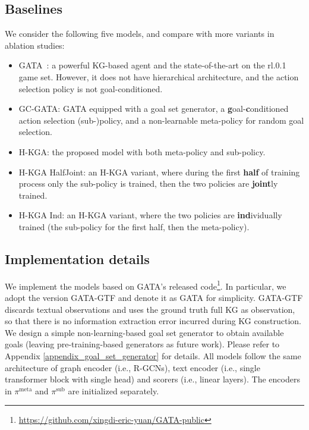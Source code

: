 \documentclass[11pt]{article}
\begin{document}
\subsection{Baselines}

We consider the following five models, and compare with more variants in ablation studies:
\begin{itemize}
    \item GATA~\cite{adhikari2020gatav2}: a powerful KG-based agent and the state-of-the-art on the rl.0.1 game set. However, it does not have hierarchical architecture, and the action selection policy is not goal-conditioned.
    \item GC-GATA: GATA equipped with a goal set generator, a \textbf{g}oal-\textbf{c}onditioned action selection (sub-)policy, and a non-learnable meta-policy for random goal selection.
    \item H-KGA: the proposed model with both meta-policy and sub-policy.
    \item H-KGA HalfJoint: an H-KGA variant, where during the first \textbf{half} of training process only the sub-policy is trained, then the two policies are \textbf{joint}ly trained. 
    \item H-KGA Ind: an H-KGA variant, where the two policies are \textbf{ind}ividually trained (the sub-policy for the first half, then the meta-policy). 
\end{itemize}

\subsection{Implementation details\label{section_implementation}}
We implement the models based on GATA's released code\footnote{\url{https://github.com/xingdi-eric-yuan/GATA-public}}.
In particular, we adopt the version GATA-GTF and denote it as GATA for simplicity. 
GATA-GTF discards textual observations and uses the ground truth full KG as observation, so that there is no information extraction error incurred during KG construction. 
We design a simple non-learning-based goal set generator to obtain available goals (leaving pre-training-based generators as future work). Please refer to Appendix \ref{appendix_goal_set_generator} for details.
All models follow the same architecture of graph encoder (i.e., R-GCNs), text encoder (i.e., single transformer block with single head) and scorers (i.e., linear layers). 
The encoders in $\pi^{\text{meta}}$ and $\pi^{\text{sub}}$ are initialized separately. 
\end{document}
